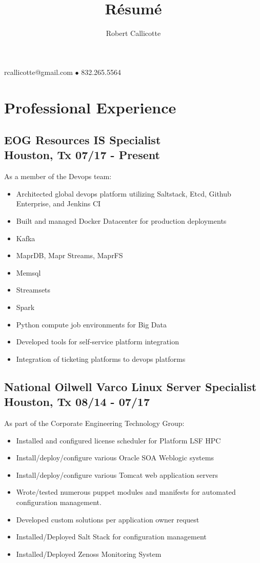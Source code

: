 \documentclass{article}
\title{R\'esum\'e}
\author{Robert Callicotte}
\makeatletter
\renewcommand{\maketitle}{
    \begin{center}
    {\huge\bfseries
    \theauthor}

    \vspace{.25em}

    rcallicotte@gmail.com $\bullet$ 832.265.5564

    \end{center}
  }
\makeatother
\begin{document}
\maketitle

\section{Professional Experience}
  \subsection{EOG Resources \hfill IS Specialist\\
    Houston, Tx \hfill 07/17 - Present
    }

  As a member of the Devops team:\\
  \begin{itemize}
  \item Architected global devops platform utilizing Saltstack, Etcd, Github Enterprise, and Jenkins CI
  \item Built and managed Docker Datacenter for production deployments
  \item Kafka
  \item MaprDB, Mapr Streams, MaprFS
  \item Memsql
  \item Streamsets
  \item Spark
  \item Python compute job environments for Big Data
  \item Developed tools for self-service platform integration
  \item Integration of ticketing platforms to devops platforms

  \end{itemize}

  \subsection{National Oilwell Varco \hfill Linux Server Specialist\\
    Houston, Tx \hfill 08/14 - 07/17
    }
  
  As part of the Corporate Engineering Technology Group:\\
  \begin{itemize}
  \item Installed and configured license scheduler for Platform LSF HPC
  \item Install/deploy/configure various Oracle SOA Weblogic systems
  \item Install/deploy/configure various Tomcat web application servers
  \item Wrote/tested numerous puppet modules and manifests for automated configuration management.
  \item Developed custom solutions per application owner request
  \item Installed/Deployed Salt Stack for configuration management
  \item Installed/Deployed Zenoss Monitoring System
  \end{itemize}  
\end{document}
